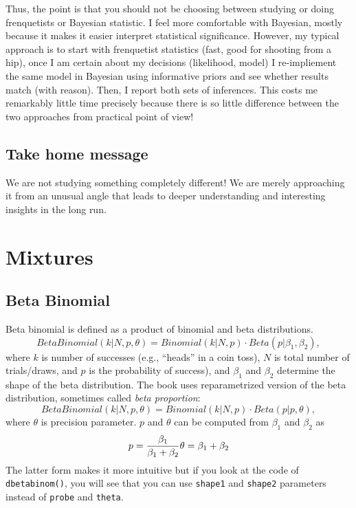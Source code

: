 \documentclass[
]{book}
\begin{document}
Thus, the point is that you should not be choosing between studying or doing frenquetists or Bayesian statistic. I feel more comfortable with Bayesian, mostly because it makes it easier interpret statistical significance. However, my typical approach is to start with frenquetist statistics (fast, good for shooting from a hip), once I am certain about my decisions (likelihood, model) I re-impliement the same model in Bayesian using informative priors and see whether results match (with reason). Then, I report both sets of inferences. This costs me remarkably little time precisely because there is so little difference between the two approaches from practical point of view!

\hypertarget{take-home-message-1}{%
\section{Take home message}\label{take-home-message-1}}

We are not studying something completely different! We are merely approaching it from an unusual angle that leads to deeper understanding and interesting insights in the long run.

\hypertarget{mixtures}{%
\chapter{Mixtures}\label{mixtures}}

\hypertarget{beta-binomial}{%
\section{Beta Binomial}\label{beta-binomial}}

Beta binomial is defined as a product of binomial and beta distributions.
\[BetaBinomial(k|N, p, \theta) = Binomial(k|N,p) \cdot Beta(p|\beta_1, \beta_2),\]
where \(k\) is number of successes (e.g., ``heads'' in a coin toss), \(N\) is total number of trials/draws, and \(p\) is the probability of success), and \(\beta_1\) and \(\beta_2\) determine the shape of the beta distribution. The book uses reparametrized version of the beta distribution, sometimes called \emph{beta proportion}:
\[BetaBinomial(k|N, p, \theta) = Binomial(k|N,p) \cdot Beta(p|p, \theta),\]
where \(\theta\) is precision parameter. \(p\) and \(\theta\) can be computed from \(\beta_1\) and \(\beta_2\) as
\[
p = \frac{\beta_1}{\beta_1 + \beta_2}\\
\theta = \beta_1 + \beta_2
\]
The latter form makes it more intuitive but if you look at the code of \texttt{dbetabinom()}, you will see that you can use \texttt{shape1} and \texttt{shape2} parameters instead of \texttt{probe} and \texttt{theta}.
\end{document}
